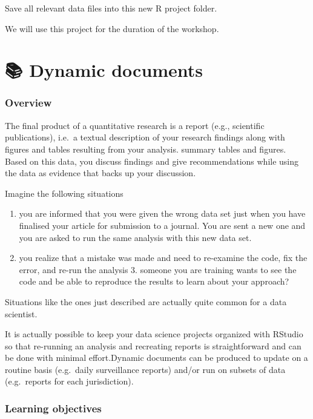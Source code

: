 \documentclass[
  letterpaper,
  DIV=11,
  numbers=noendperiod]{scrreprt}
\providecommand{\tightlist}{%
  \setlength{\itemsep}{0pt}\setlength{\parskip}{0pt}}\usepackage{longtable,booktabs,array}
\begin{document}
Save all relevant data files into this new R project folder.

We will use this project for the duration of the workshop.

\hypertarget{dynamic-documents}{%
\chapter{\texorpdfstring{{📚} Dynamic
documents}{📚 Dynamic documents}}\label{dynamic-documents}}

\hypertarget{overview-3}{%
\subsection{Overview}\label{overview-3}}

The final product of a quantitative research is a report (e.g.,
scientific publications), i.e.~a textual description of your research
findings along with figures and tables resulting from your analysis.
summary tables and figures. Based on this data, you discuss findings and
give recommendations while using the data as evidence that backs up your
discussion.

Imagine the following situations

\begin{enumerate}
\def\labelenumi{\arabic{enumi}.}
\tightlist
\item
  you are informed that you were given the wrong data set just when you
  have finalised your article for submission to a journal. You are sent
  a new one and you are asked to run the same analysis with this new
  data set.
\item
  you realize that a mistake was made and need to re-examine the code,
  fix the error, and re-run the analysis 3. someone you are training
  wants to see the code and be able to reproduce the results to learn
  about your approach?
\end{enumerate}

Situations like the ones just described are actually quite common for a
data scientist.

It is actually possible to keep your data science projects organized
with RStudio so that re-running an analysis and recreating reports is
straightforward and can be done with minimal effort.Dynamic documents
can be produced to update on a routine basis (e.g.~daily surveillance
reports) and/or run on subsets of data (e.g.~reports for each
jurisdiction).

\hypertarget{learning-objectives-4}{%
\subsection{Learning objectives}\label{learning-objectives-4}}
\end{document}
